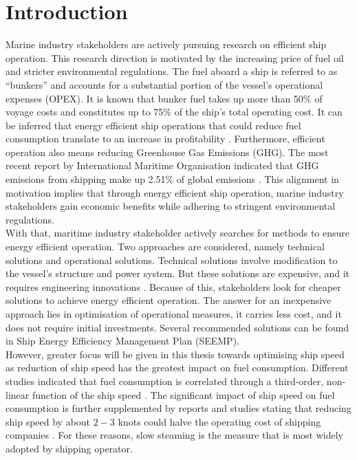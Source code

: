 \chapter{Introduction} \label{chp:introduction}

Marine industry stakeholders are actively pursuing research on efficient ship operation. This research direction is motivated by the increasing price of fuel oil and stricter environmental regulations. The fuel aboard a ship is referred to as ``bunkers'' and accounts for a substantial portion of the vessel's operational expenses (OPEX). It is known that bunker fuel takes up more than 50\% of voyage costs and constitutes up to 75\% of the ship's total operating cost. It can be inferred that energy efficient ship operations that could reduce fuel consumption translate to an increase in profitability . Furthermore, efficient operation also means reducing Greenhouse Gas Emissions (GHG). The most recent report by International Maritime Organisation indicated that GHG emissions from shipping make up 2.51\% of global emissions . This alignment in motivation implies that through energy efficient ship operation, marine industry stakeholders gain economic benefits while adhering to stringent environmental regulations. \\

With that, maritime industry stakeholder actively searches for methods to ensure energy efficient operation. Two approaches are considered, namely technical solutions and operational solutions. Technical solutions involve modification to the vessel's structure and power system. But these solutions are expensive, and it requires engineering innovations . Because of this, stakeholders look for cheaper solutions to achieve energy efficient operation. The answer for an inexpensive approach lies in optimisation of operational measures, it carries less cost, and it does not require initial investments. Several recommended solutions can be found in Ship Energy Efficiency Management Plan (SEEMP).\\ 

However, greater focus will be given in this thesis towards optimising ship speed as reduction of ship speed has the greatest impact on fuel consumption. Different studies indicated that fuel consumption is correlated through a third-order, non-linear function of the ship speed . The significant impact of ship speed on fuel consumption is further supplemented by reports and studies stating that reducing ship speed by about $2-3$ knots could halve the operating cost of shipping companies . For these reasons, slow steaming is the measure that is most widely adopted by shipping operator. \\

